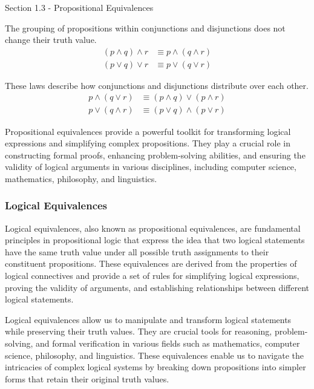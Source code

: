 \begin{notes}{Section 1.3 - Propositional Equivalences}
    \begin{highlight}
        The grouping of propositions within conjunctions and disjunctions does not change their truth value.
        \begin{align*}
            (p \wedge q) \wedge r & \equiv p \wedge (q \wedge r) \\
            (p \vee q) \vee r & \equiv p \vee (q \vee r)
        \end{align*}
    \end{highlight}

    \begin{highlight}
        These laws describe how conjunctions and disjunctions distribute over each other.
        \begin{align*}
            p \wedge (q \vee r) & \equiv (p \wedge q) \vee (p \wedge r) \\
            p \vee (q \wedge r) & \equiv (p \vee q) \wedge (p \vee r)
        \end{align*}
    \end{highlight}

    Propositional equivalences provide a powerful toolkit for transforming logical expressions and simplifying complex propositions. They play a crucial role in constructing formal proofs, enhancing 
    problem-solving abilities, and ensuring the validity of logical arguments in various disciplines, including computer science, mathematics, philosophy, and linguistics.

    \subsubsection*{Logical Equivalences}

    Logical equivalences, also known as propositional equivalences, are fundamental principles in propositional logic that express the idea that two logical statements have the same truth value under 
    all possible truth assignments to their constituent propositions. These equivalences are derived from the properties of logical connectives and provide a set of rules for simplifying logical 
    expressions, proving the validity of arguments, and establishing relationships between different logical statements.

    Logical equivalences allow us to manipulate and transform logical statements while preserving their truth values. They are crucial tools for reasoning, problem-solving, and formal verification in 
    various fields such as mathematics, computer science, philosophy, and linguistics. These equivalences enable us to navigate the intricacies of complex logical systems by breaking down propositions 
    into simpler forms that retain their original truth values.


\end{notes}
